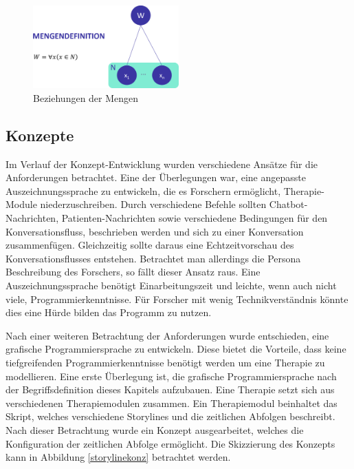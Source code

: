 \begin{figure}[h]
\centering
\includegraphics[width=0.5\textwidth]{pictures/toolboxdef}
\caption{Beziehungen der Mengen}
\label{therapiedef}
\end{figure}



\subsection{Konzepte}
Im Verlauf der Konzept-Entwicklung wurden verschiedene Ansätze für die Anforderungen betrachtet. Eine der Überlegungen war, eine angepasste Auszeichnungssprache zu entwickeln, die es Forschern ermöglicht, Therapie-Module niederzuschreiben. Durch verschiedene Befehle sollten Chatbot-Nachrichten, Patienten-Nachrichten sowie verschiedene Bedingungen für den Konversationsfluss, beschrieben werden und sich zu einer Konversation zusammenfügen. Gleichzeitig sollte daraus eine Echtzeitvorschau des Konversationsflusses entstehen. Betrachtet man allerdings die Persona Beschreibung des Forschers, so fällt dieser Ansatz raus. Eine Auszeichnungssprache benötigt Einarbeitungszeit und leichte, wenn auch nicht viele, Programmierkenntnisse. Für Forscher mit wenig Technikverständnis könnte dies eine Hürde bilden das Programm zu nutzen. 

Nach einer weiteren Betrachtung der Anforderungen wurde entschieden, eine grafische Programmiersprache zu entwickeln. Diese bietet die Vorteile, dass keine tiefgreifenden Programmierkenntnisse benötigt werden um eine Therapie zu modellieren. Eine erste Überlegung ist, die grafische Programmiersprache nach der Begriffsdefinition dieses Kapitels aufzubauen. Eine Therapie setzt sich aus verschiedenen Therapiemodulen zusammen. Ein Therapiemodul beinhaltet das Skript, welches verschiedene Storylines und die zeitlichen Abfolgen beschreibt. Nach dieser Betrachtung wurde ein Konzept ausgearbeitet, welches die Konfiguration der zeitlichen Abfolge ermöglicht. Die Skizzierung des Konzepts kann in Abbildung \ref{storylinekonz} betrachtet werden.

